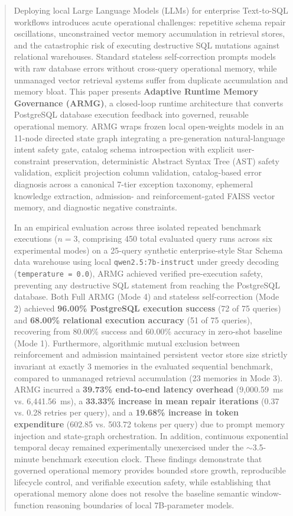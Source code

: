 \documentclass[conference]{IEEEtran}
\begin{document}
\begin{abstract}
Deploying local Large Language Models (LLMs) for enterprise Text-to-SQL workflows introduces acute operational challenges: repetitive schema repair oscillations, unconstrained vector memory accumulation in retrieval stores, and the catastrophic risk of executing destructive SQL mutations against relational warehouses. Standard stateless self-correction prompts models with raw database errors without cross-query operational memory, while unmanaged vector retrieval systems suffer from duplicate accumulation and memory bloat. This paper presents \textbf{Adaptive Runtime Memory Governance (ARMG)}, a closed-loop runtime architecture that converts PostgreSQL database execution feedback into governed, reusable operational memory. ARMG wraps frozen local open-weights models in an 11-node directed state graph integrating a pre-generation natural-language intent safety gate, catalog schema introspection with explicit user-constraint preservation, deterministic Abstract Syntax Tree (AST) safety validation, explicit projection column validation, catalog-based error diagnosis across a canonical 7-tier exception taxonomy, ephemeral knowledge extraction, admission- and reinforcement-gated FAISS vector memory, and diagnostic negative constraints.

In an empirical evaluation across three isolated repeated benchmark executions ($n = 3$, comprising 450 total evaluated query runs across six experimental modes) on a 25-query synthetic enterprise-style Star Schema data warehouse using local \texttt{qwen2.5:7b-instruct} under greedy decoding (\texttt{temperature = 0.0}), ARMG achieved verified pre-execution safety, preventing any destructive SQL statement from reaching the PostgreSQL database. Both Full ARMG (Mode 4) and stateless self-correction (Mode 2) achieved \textbf{96.00\% PostgreSQL execution success} (72 of 75 queries) and \textbf{68.00\% relational execution accuracy} (51 of 75 queries), recovering from 80.00\% success and 60.00\% accuracy in zero-shot baseline (Mode 1). Furthermore, algorithmic mutual exclusion between reinforcement and admission maintained persistent vector store size strictly invariant at exactly 3 memories in the evaluated sequential benchmark, compared to unmanaged retrieval accumulation (23 memories in Mode 3). ARMG incurred a \textbf{39.73\% end-to-end latency overhead} (9,000.59~ms vs. 6,441.56~ms), a \textbf{33.33\% increase in mean repair iterations} (0.37 vs. 0.28 retries per query), and a \textbf{19.68\% increase in token expenditure} (602.85 vs. 503.72 tokens per query) due to prompt memory injection and state-graph orchestration. In addition, continuous exponential temporal decay remained experimentally unexercised under the $\sim$3.5-minute benchmark execution clock. These findings demonstrate that governed operational memory provides bounded store growth, reproducible lifecycle control, and verifiable execution safety, while establishing that operational memory alone does not resolve the baseline semantic window-function reasoning boundaries of local 7B-parameter models.
\end{abstract}
\end{document}
